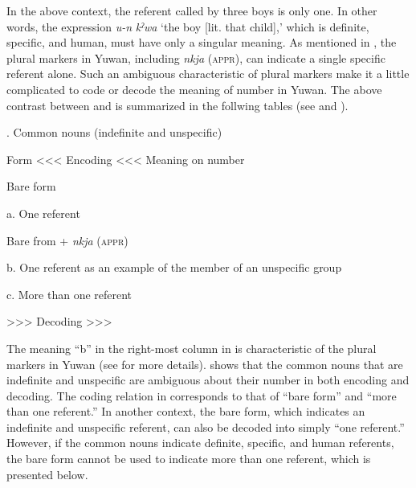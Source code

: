 \z

In the above context, the referent called by three boys is only one. In other words, the expression \textit{u-n} \textit{kˀwa} ‘the boy [lit. that child],’ which is definite, specific, and human, must have only a singular meaning. As mentioned in , the plural markers in Yuwan, including \textit{nkja} (\textsc{appr}), can indicate a single specific referent alone. Such an ambiguous characteristic of plural markers make it a little complicated to code or decode the meaning of number in Yuwan. The above contrast between  and  is summarized in the follwing tables (see  and ).

\begin{table}
\caption{\label{tab:key:45}. Common nouns (indefinite and unspecific)}

Form  <<< Encoding <<<  Meaning on number

Bare form  %


a. One referent

Bare from + \textit{nkja} (\textsc{appr})  %


b. One referent as an example of the member of an unspecific group

c. More than one referent

  >>> Decoding >>>
\end{table}

The meaning “b” in the right-most column in  is characteristic of the plural markers in Yuwan (see  for more details).  shows that the common nouns that are indefinite and unspecific are ambiguous about their number in both encoding and decoding. The coding relation in  corresponds to that of “bare form” and “more than one referent.” In another context, the bare form, which indicates an indefinite and unspecific referent, can also be decoded into simply “one referent.” However, if the common nouns indicate definite, specific, and human referents, the bare form cannot be used to indicate more than one referent, which is presented below.

